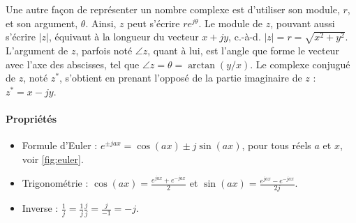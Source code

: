 \documentclass [a4paper, 11pt] {article}
\begin{document}
    Une autre façon de représenter un nombre complexe est d'utiliser son module, $r$, et son argument, $\theta$. Ainsi, $z$ peut s'écrire $r e^{j \theta}$. Le module de $z$, pouvant aussi s'écrire $|z|$, équivaut à la longueur du vecteur $x+jy$, c.-à-d. $|z|=r=\sqrt{x^2 + y^2}$. L'argument de $z$, parfois noté $\angle z$, quant à lui, est l'angle que forme le vecteur avec l'axe des abscisses, tel que $\angle z = \theta = \arctan(y/x)$. Le complexe conjugué de $z$, noté $z^*$, s'obtient en prenant l'opposé de la partie imaginaire de $z$ : $z^*=x - j y$.
    
    \paragraph{Propriétés}
    
    \begin{itemize}
        \item Formule d'Euler : $e^{\pm j a x} = \cos(ax) \pm j \sin(a x)$, pour tous réels $a$ et $x$, voir \autoref{fig:euler}.
        \item Trigonométrie : $\cos(a x) = \frac{e^{ j a x} + e^{-ja x}}{2}$ et $\sin(a x) = \frac{e^{ ja x} - e^{-ja x}}{2j}$.
        \item Inverse : $\frac{1}{j} = \frac{1}{j} \frac{j}{j} = \frac{j}{-1} = -j$.
    \end{itemize}
    
\end{document}
